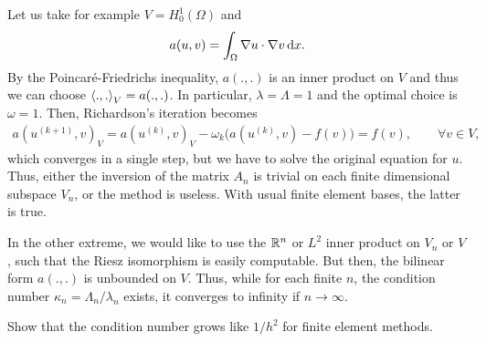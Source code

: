 \begin{example}
  Let us take for example $V = H^1_0(\Omega)$ and
  \begin{gather*}
    a(u,v) = \int_{\Omega} \nabla u \cdot \nabla v\,\mathrm{d} x.
  \end{gather*}
  By the Poincaré-Friedrichs inequality, $a(.,.)$ is an inner product
  on $V$ and thus we can choose $\scal(.,.)_V = a(.,.)$. In
  particular, $\lambda = \Lambda = 1$ and the optimal choice is
  $\omega = 1$. Then, Richardson's iteration becomes
  \begin{gather*}
        a(u^{(k+1)},v)_V = a(u^{(k)},v)_V
    - \omega_k \bigl(a(u^{(k)},v) - f(v)\bigr) =  f(v), \qquad \forall v\in V,
  \end{gather*}
  which converges in a single step, but we have to solve the original
  equation for $u$. Thus, either the inversion of the matrix $A_n$ is
  trivial on each finite dimensional subspace $V_n$, or the method is
  useless. With usual finite element bases, the latter is true.
\end{example}

\begin{example}
  In the other extreme, we would like to use the $\mathbb R^n$ or $L^2$
  inner product on $V_n$ or $V$, such that the Riesz isomorphism is
  easily computable. But then, the bilinear form $a(.,.)$ is unbounded
  on $V$. Thus, while for each finite $n$, the condition number
  $\kappa_n = \Lambda_n/\lambda_n$ exists, it converges to infinity if
  $n\to\infty$.
\end{example}

\begin{todo}
  Show that the condition number grows like $1/h^2$ for finite element
  methods.
\end{todo}


